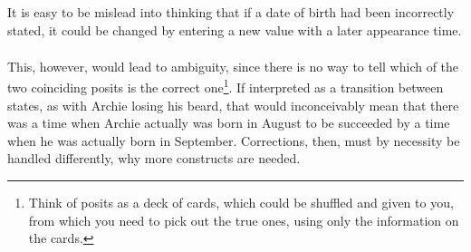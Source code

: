 \documentclass[sfsidenotes,nobib,twoside,symmetric]{tufte-handout}
\begin{document}
It is easy to be mislead into thinking that if a date of birth had been incorrectly stated, it could be changed by entering a new value with a later appearance time. 
\begin{align*}
[\{(A, \textit{has birth date})\}, \textrm{1972-09-21}, \textrm{1972-09-21}]  
\end{align*}

This, however, would lead to ambiguity, since there is no way to tell which of the two coinciding posits is the correct one\footnote{Think of posits as a deck of cards, which could be shuffled and given to you, from which you need to pick out the true ones, using only the information on the cards.}. If interpreted as a transition between states, as with Archie losing his beard, that would inconceivably mean that there was a time when Archie actually was born in August to be succeeded by a time when he was actually born in September. Corrections, then, must by necessity be handled differently, why more constructs are needed.





\end{document}
